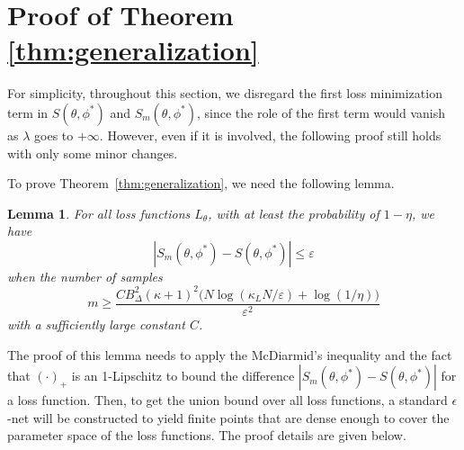 \documentclass[11pt,fullpage, letterpaper,twoside]{article}
\newtheorem{lemma}{Lemma}
\newcommand{\1}[1]{\mathds{1}_{\left[#1\right]}}
\begin{document}
\section{Proof of Theorem \ref{thm:generalization}}\label{sec:gen_proof}
For simplicity, throughout this section, we disregard the first loss minimization term in $S(\theta,\phi^*)$ and $S_m(\theta,\phi^*)$, since the role of the first term would vanish as $\lambda$ goes to $+\infty$. However, even if it is involved, the following proof still holds with only some minor changes.





To prove Theorem~\ref{thm:generalization}, we need the following lemma.
\begin{lemma}
For all loss functions $L_\theta$, with at least the probability of $1-\eta$, we have
$$
|S_m(\theta,\phi^*)-S(\theta,\phi^*)|\leq \varepsilon
$$
when the number of samples $$
m\geq\dfrac{C B_\Delta^2(\kappa+1)^2 \big(N \log(\kappa_L N/\varepsilon)+\log(1/\eta)\big)}{\varepsilon^2}$$
with a sufficiently large constant $C$.
\end{lemma}
The proof of this lemma needs to apply the McDiarmid's inequality and the fact that $(\cdot)_+$ is an 1-Lipschitz
to bound the difference $|S_m(\theta,\phi^*)-S(\theta,\phi^*)|$ for a loss function.  Then, to get the union bound over all loss functions, a standard $\epsilon$-net \cite{arora2017generalization} will be constructed to yield finite points that are dense enough to cover the parameter space of the loss functions. The proof details are given below.
\end{document}
